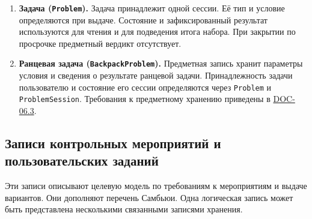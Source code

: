 \documentclass[12pt,a4paper]{article}
\begin{document}
\begin{enumerate}
\item
  \textbf{Задача (\texttt{Problem}).} Задача принадлежит одной сессии. Её тип и условие определяются при выдаче. Состояние и зафиксированный результат используются для чтения и для подведения итога набора. При закрытии по просрочке предметный вердикт отсутствует.
\item
  \textbf{Ранцевая задача (\texttt{Backpack\allowbreak{}Problem}).} Предметная запись хранит параметры условия и сведения о результате ранцевой задачи. Принадлежность задачи пользователю и состояние его сессии определяются через \texttt{Problem} и \texttt{Problem\allowbreak{}Session}. Требования к предметному хранению приведены в {\href{DOC-06.3\_Ранцевые\_криптосистемы.pdf\#doc-063-ранцевые-криптосистемы}{DOC-06.3}}.
\end{enumerate}

\subsection{Записи контрольных мероприятий и пользовательских заданий}\label{ux437ux430ux43fux438ux441ux438-ux43aux43eux43dux442ux440ux43eux43bux44cux43dux44bux445-ux43cux435ux440ux43eux43fux440ux438ux44fux442ux438ux439-ux438-ux43fux43eux43bux44cux437ux43eux432ux430ux442ux435ux43bux44cux441ux43aux438ux445-ux437ux430ux434ux430ux43dux438ux439}

\hypertarget{записи-контрольных-мероприятий-и-пользовательских-заданий}{}

Эти записи описывают целевую модель по требованиям к мероприятиям и выдаче вариантов. Они дополняют перечень Самбьюи. Одна логическая запись может быть представлена несколькими связанными записями хранения.
\end{document}
